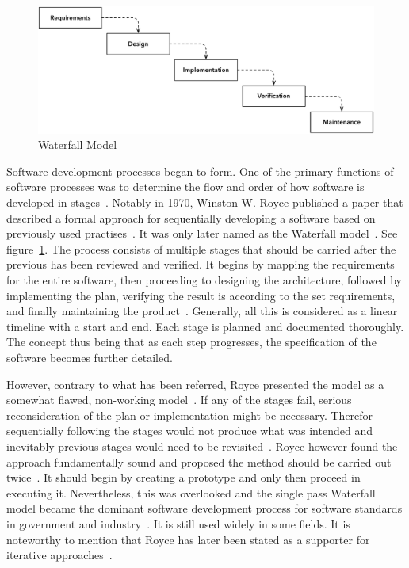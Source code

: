 \documentclass[english]{tktltiki2}
\begin{document}
\begin{figure}[h!]

    \centering
    \vspace{1cm}

    \includegraphics[width = \textwidth]{figures/waterfall-model}

    \caption{Waterfall Model}
    \label{figure:waterfall-model}

    \vspace{1cm}

\end{figure}

Software development processes began to form. One of the primary functions of software processes was to determine the flow and order of how software is developed in stages~\cite{Boe88}. Notably in 1970, Winston W. Royce published a paper that described a formal approach for sequentially developing a software based on previously used practises~\cite{Roy70}. It was only later named as the Waterfall model~\cite{Boe88, LB03}. See figure~\ref{figure:waterfall-model}. The process consists of multiple stages that should be carried after the previous has been reviewed and verified. It begins by mapping the requirements for the entire software, then proceeding to designing the architecture, followed by implementing the plan, verifying the result is according to the set requirements, and finally maintaining the product~\cite{Roy70}. Generally, all this is considered as a linear timeline with a start and end. Each stage is planned and documented thoroughly. The concept thus being that as each step progresses, the specification of the software becomes further detailed.

However, contrary to what has been referred, Royce presented the model as a somewhat flawed, non-working model~\cite{Roy70}. If any of the stages fail, serious reconsideration of the plan or implementation might be necessary. Therefor sequentially following the stages would not produce what was intended and inevitably previous stages would need to be revisited~\cite{Roy70}. Royce however found the approach fundamentally sound and proposed the method should be carried out twice~\cite{Roy70, Boe88}. It should begin by creating a prototype and only then proceed in executing it. Nevertheless, this was overlooked and the single pass Waterfall model became the dominant software development process for software standards in government and industry~\cite{Boe88, LB03}. It is still used widely in some fields. It is noteworthy to mention that Royce has later been stated as a supporter for iterative approaches~\cite{LB03}.
\end{document}
